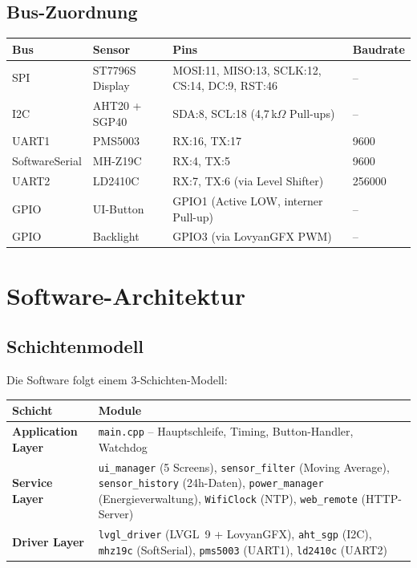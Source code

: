 \documentclass[a4paper,11pt]{article}
\begin{document}
\subsection{Bus-Zuordnung}

\begin{tabularx}{\textwidth}{llXl}
\toprule
\rowcolor{tableheader}
\textbf{Bus} & \textbf{Sensor} & \textbf{Pins} & \textbf{Baudrate} \\
\midrule
SPI & ST7796S Display & MOSI:11, MISO:13, SCLK:12, CS:14, DC:9, RST:46 & -- \\
I2C & AHT20 + SGP40 & SDA:8, SCL:18 (4{,}7\,k$\Omega$ Pull-ups) & -- \\
UART1 & PMS5003 & RX:16, TX:17 & 9600 \\
SoftwareSerial & MH-Z19C & RX:4, TX:5 & 9600 \\
UART2 & LD2410C & RX:7, TX:6 (via Level Shifter) & 256000 \\
GPIO & UI-Button & GPIO1 (Active LOW, interner Pull-up) & -- \\
GPIO & Backlight & GPIO3 (via LovyanGFX PWM) & -- \\
\bottomrule
\end{tabularx}

\section{Software-Architektur}

\subsection{Schichtenmodell}

Die Software folgt einem 3-Schichten-Modell:

\begin{tabularx}{\textwidth}{lX}
\toprule
\rowcolor{tableheader}
\textbf{Schicht} & \textbf{Module} \\
\midrule
\textbf{Application Layer} & \texttt{main.cpp} -- Hauptschleife, Timing, Button-Handler, Watchdog \\
\textbf{Service Layer} & \texttt{ui\_manager} (5 Screens), \texttt{sensor\_filter} (Moving Average), \texttt{sensor\_history} (24h-Daten), \texttt{power\_manager} (Energieverwaltung), \texttt{WifiClock} (NTP), \texttt{web\_remote} (HTTP-Server) \\
\textbf{Driver Layer} & \texttt{lvgl\_driver} (LVGL~9 + LovyanGFX), \texttt{aht\_sgp} (I2C), \texttt{mhz19c} (SoftSerial), \texttt{pms5003} (UART1), \texttt{ld2410c} (UART2) \\
\bottomrule
\end{tabularx}
\end{document}
